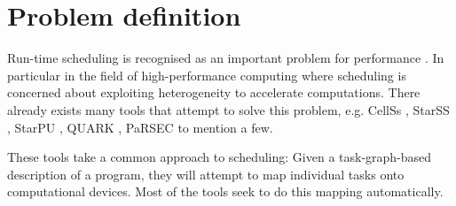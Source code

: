 \documentclass[preprint,10pt,numbers]{sigplanconf}
\begin{document}



  \section{Problem definition}
Run-time scheduling is recognised as an important problem for performance \cite{Augonnet2011,Augonnet2012,Agullo2015}. In particular in the field of high-performance computing where scheduling is concerned about exploiting heterogeneity to accelerate computations. There already exists many tools that attempt to solve this problem, e.g. CellSs \cite{Bellens2009}, StarSS \cite{Planas2009}, StarPU \cite{Augonnet2011}, QUARK \cite{YarKhan2011}, PaRSEC \cite{Bosilca2013} to mention a few.

These tools take a common approach to scheduling: Given a task-graph-based description of a program, they will attempt to map individual tasks onto computational devices. Most of the tools seek to do this mapping automatically.
\end{document}
